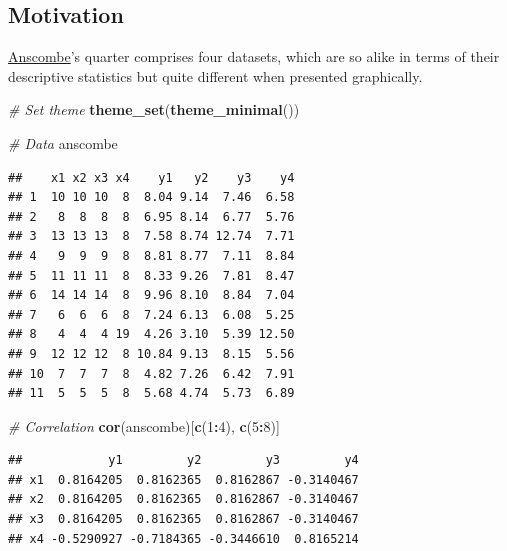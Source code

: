 \documentclass[
]{book}
\newenvironment{Shaded}{\begin{snugshade}}{\end{snugshade}}
\newcommand{\CommentTok}[1]{\textcolor[rgb]{0.56,0.35,0.01}{\textit{#1}}}
\newcommand{\DecValTok}[1]{\textcolor[rgb]{0.00,0.00,0.81}{#1}}
\newcommand{\FunctionTok}[1]{\textcolor[rgb]{0.13,0.29,0.53}{\textbf{#1}}}
\newcommand{\NormalTok}[1]{#1}
\newcommand{\SpecialCharTok}[1]{\textcolor[rgb]{0.81,0.36,0.00}{\textbf{#1}}}
\begin{document}
\subsection{Motivation}\label{motivation-2}

\href{https://en.wikipedia.org/wiki/Frank_Anscombe}{Anscombe}'s quarter comprises four datasets, which are so alike in terms of their descriptive statistics but quite different when presented graphically.

\begin{Shaded}
\begin{Highlighting}[]
\CommentTok{\# Set theme}
\FunctionTok{theme\_set}\NormalTok{(}\FunctionTok{theme\_minimal}\NormalTok{())}
\end{Highlighting}
\end{Shaded}

\begin{Shaded}
\begin{Highlighting}[]
\CommentTok{\# Data}
\NormalTok{anscombe}
\end{Highlighting}
\end{Shaded}

\begin{verbatim}
##    x1 x2 x3 x4    y1   y2    y3    y4
## 1  10 10 10  8  8.04 9.14  7.46  6.58
## 2   8  8  8  8  6.95 8.14  6.77  5.76
## 3  13 13 13  8  7.58 8.74 12.74  7.71
## 4   9  9  9  8  8.81 8.77  7.11  8.84
## 5  11 11 11  8  8.33 9.26  7.81  8.47
## 6  14 14 14  8  9.96 8.10  8.84  7.04
## 7   6  6  6  8  7.24 6.13  6.08  5.25
## 8   4  4  4 19  4.26 3.10  5.39 12.50
## 9  12 12 12  8 10.84 9.13  8.15  5.56
## 10  7  7  7  8  4.82 7.26  6.42  7.91
## 11  5  5  5  8  5.68 4.74  5.73  6.89
\end{verbatim}

\begin{Shaded}
\begin{Highlighting}[]
\CommentTok{\# Correlation}
\FunctionTok{cor}\NormalTok{(anscombe)[}\FunctionTok{c}\NormalTok{(}\DecValTok{1}\SpecialCharTok{:}\DecValTok{4}\NormalTok{), }\FunctionTok{c}\NormalTok{(}\DecValTok{5}\SpecialCharTok{:}\DecValTok{8}\NormalTok{)]}
\end{Highlighting}
\end{Shaded}

\begin{verbatim}
##            y1         y2         y3         y4
## x1  0.8164205  0.8162365  0.8162867 -0.3140467
## x2  0.8164205  0.8162365  0.8162867 -0.3140467
## x3  0.8164205  0.8162365  0.8162867 -0.3140467
## x4 -0.5290927 -0.7184365 -0.3446610  0.8165214
\end{verbatim}
\end{document}
